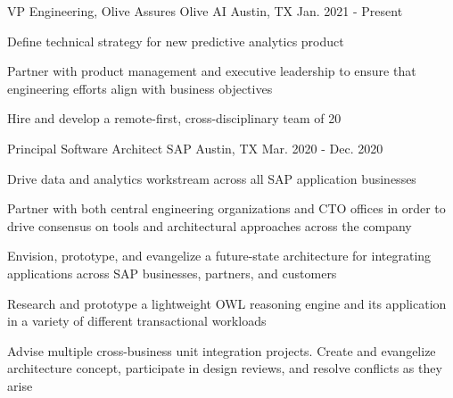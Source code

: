 


\begin{cventries}


\cventry
{VP Engineering, Olive Assures}
{Olive AI}
{Austin, TX}
{Jan. 2021 - Present}
{
  \begin{cvitems}
  \item {Define technical strategy for new predictive analytics product}
  \item {Partner with product management and executive leadership to ensure that engineering efforts align with business objectives}
  \item {Hire and develop a remote-first, cross-disciplinary team of 20}
  \end{cvitems}
}


\cventry
{Principal Software Architect}
{SAP}
{Austin, TX}
{Mar. 2020 - Dec. 2020}
{
  \begin{cvitems}
  \item {Drive data and analytics workstream across all SAP application businesses}
  \item {Partner with both central engineering organizations and CTO offices in order to drive consensus on tools and architectural approaches across the company}
  \item {Envision, prototype, and evangelize a future-state architecture for integrating applications across SAP businesses, partners, and customers}
  \item {Research and prototype a lightweight OWL reasoning engine and its application in a variety of different transactional workloads}
  \item {Advise multiple cross-business unit integration projects. Create and evangelize architecture concept, participate in design reviews, and resolve conflicts as they arise}
  \end{cvitems}
}


\end{cventries}
